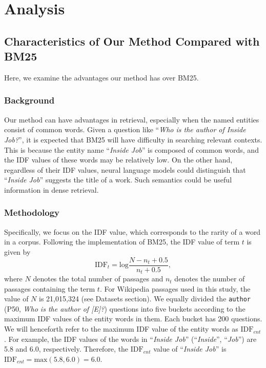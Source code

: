 \documentclass[letterpaper]{article} %
\begin{document}
\section{Analysis}\label{sec:analysis}

\subsection{Characteristics of Our Method Compared with BM25}\label{sec:exp_idf}
Here, we examine the advantages our method has over BM25.
\subsubsection{Background}
Our method can have advantages in retrieval, especially when the named entities consist of common words.
Given a question like ``\textit{Who is the author of Inside Job?}'', it is expected that BM25 will have difficulty in searching relevant contexts.
This is because the entity name ``\textit{Inside Job}'' is composed of common words, and the IDF values of these words may be relatively low.
On the other hand, regardless of their IDF values, neural language models could distinguish that ``\textit{Inside Job}'' suggests the title of a work.
Such semantics could be useful information in dense retrieval.

\subsubsection{Methodology}
Specifically, we focus on the IDF value, which corresponds to the rarity of a word in a corpus.
Following the implementation of BM25, the IDF value of term $t$ is given by
$$ \mathrm{IDF}_t = \mathrm{log}\frac{N - n_t + 0.5}{n_t + 0.5} ,$$
where $N$ denotes the total number of passages and $n_t$ denotes the number of passages containing the term $t$.
For Wikipedia passages used in this study, the value of $N$ is 21,015,324 (see Datasets section).
We equally divided the \texttt{\small author} (P50, \textit{Who is the author of [E]?}) questions into five buckets according to the maximum IDF values of the entity words in them.
Each bucket has 200 questions.
We will henceforth refer to the maximum IDF value of the entity words as $\mathrm{IDF}_{ent}$.
For example, the IDF values of the words in ``\textit{Inside Job}'' (``\textit{Inside}'', ``\textit{Job}'') are 5.8 and 6.0, respectively.
Therefore, the $\mathrm{IDF}_{ent}$ value of ``\textit{Inside Job}'' is $\mathrm{IDF}_{ent} = \mathrm{max}(5.8, 6.0) = 6.0$.
\end{document}
